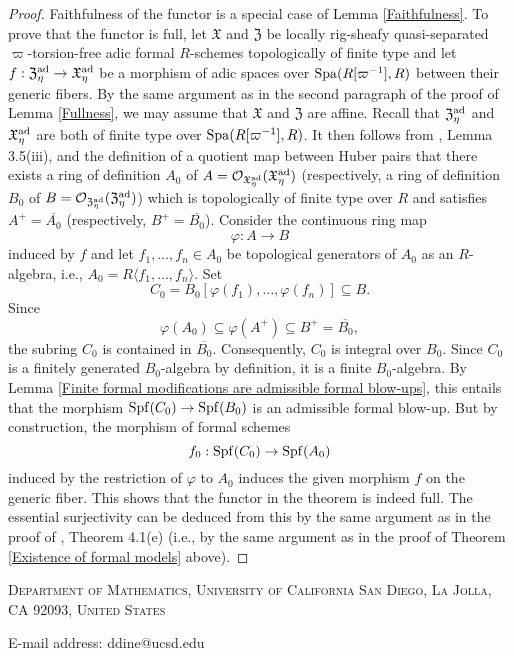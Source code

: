 \documentclass[12pt,twoside,a4paper]{article}
\theoremstyle{definition}
\theoremstyle{remark}
\newcommand\ad{{\rm ad}}
\newcommand\Spa{{\rm Spa}}
\newcommand\Spf{{\rm Spf}}
\begin{document}
\begin{proof}Faithfulness of the functor is a special case of Lemma \ref{Faithfulness}. To prove that the functor is full, let $\mathfrak{X}$ and $\mathfrak{Z}$ be locally rig-sheafy quasi-separated $\varpi$-torsion-free adic formal $R$-schemes topologically of finite type and let $f: \mathfrak{Z}_{\eta}^{\ad}\to \mathfrak{X}_{\eta}^{\ad}$ be a morphism of adic spaces over $\Spa(R[\varpi^{-1}], R)$ between their generic fibers. By the same argument as in the second paragraph of the proof of Lemma \ref{Fullness}, we may assume that $\mathfrak{X}$ and $\mathfrak{Z}$ are affine. Recall that $\mathfrak{Z}_{\eta}^{\ad}$ and $\mathfrak{X}_{\eta}^{\ad}$ are both of finite type over $\Spa(R[\varpi^{-1}], R)$. It then follows from \cite{Huber2}, Lemma 3.5(iii), and the definition of a quotient map between Huber pairs that there exists a ring of definition $A_{0}$ of $A=\mathcal{O}_{\mathfrak{X}_{\eta}^{\ad}}(\mathfrak{X}_{\eta}^{\ad})$ (respectively, a ring of definition $B_{0}$ of $B=\mathcal{O}_{\mathfrak{Z}_{\eta}^{\ad}}(\mathfrak{Z}_{\eta}^{\ad})$) which is topologically of finite type over $R$ and satisfies $A^{+}=\overline{A_{0}}$ (respectively, $B^{+}=\overline{B_{0}}$). Consider the continuous ring map \begin{equation*}\varphi: A\to B\end{equation*}induced by $f$ and let $f_1,\dots, f_n\in A_{0}$ be topological generators of $A_{0}$ as an $R$-algebra, i.e., $A_{0}=R\langle f_1,\dots, f_n\rangle$. Set \begin{equation*}C_{0}=B_{0}[\varphi(f_1),\dots,\varphi(f_n)]\subseteq B.\end{equation*}Since \begin{equation*}\varphi(A_{0})\subseteq \varphi(A^{+})\subseteq B^{+}=\overline{B_{0}},\end{equation*}the subring $C_{0}$ is contained in $\overline{B_{0}}$. Consequently, $C_{0}$ is integral over $B_{0}$. Since $C_{0}$ is a finitely generated $B_{0}$-algebra by definition, it is a finite $B_{0}$-algebra. By Lemma \ref{Finite formal modifications are admissible formal blow-ups}, this entails that the morphism $\Spf(C_{0})\to \Spf(B_{0})$ is an admissible formal blow-up. But by construction, the morphism of formal schemes \begin{equation*}f_{0}: \Spf(C_{0})\to \Spf(A_{0})\end{equation*}induced by the restriction of $\varphi$ to $A_{0}$ induces the given morphism $f$ on the generic fiber. This shows that the functor in the theorem is indeed full. The essential surjectivity can be deduced from this by the same argument as in the proof of \cite{BL1}, Theorem 4.1(e) (i.e., by the same argument as in the proof of Theorem \ref{Existence of formal models} above).\end{proof}

 


\textsc{Department of Mathematics, University of California San Diego, La Jolla, CA 92093, United States} \newline 

E-mail address: \textsf{ddine@ucsd.edu}
\end{document}
